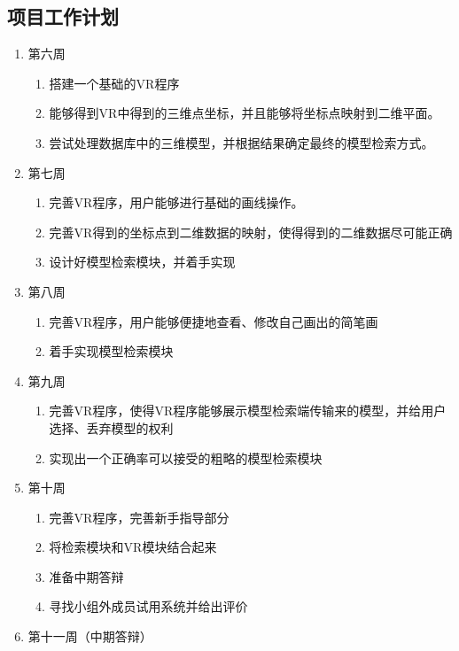 \documentclass{article}
\begin{document}
\subsection{项目工作计划}
\begin{enumerate}
    \item 第六周  
    \begin{enumerate}
        \item 搭建一个基础的VR程序 
        \item 能够得到VR中得到的三维点坐标，并且能够将坐标点映射到二维平面。
        \item 尝试处理数据库中的三维模型，并根据结果确定最终的模型检索方式。
    \end{enumerate}
    \item 第七周
    \begin{enumerate}
        \item 完善VR程序，用户能够进行基础的画线操作。
        \item 完善VR得到的坐标点到二维数据的映射，使得得到的二维数据尽可能正确
        \item 设计好模型检索模块，并着手实现
    \end{enumerate}
    \item 第八周
    \begin{enumerate}
        \item 完善VR程序，用户能够便捷地查看、修改自己画出的简笔画
        \item 着手实现模型检索模块
    \end{enumerate}
    \item 第九周
    \begin{enumerate}
        \item 完善VR程序，使得VR程序能够展示模型检索端传输来的模型，并给用户选择、丢弃模型的权利
        \item 实现出一个正确率可以接受的粗略的模型检索模块
    \end{enumerate}
    \item 第十周
    \begin{enumerate}
        \item 完善VR程序，完善新手指导部分
        \item 将检索模块和VR模块结合起来
        \item 准备中期答辩
        \item 寻找小组外成员试用系统并给出评价
    \end{enumerate}
    \item 第十一周（中期答辩）
    \begin{enumerate}

\end{enumerate}
\end{enumerate}
\end{document}
